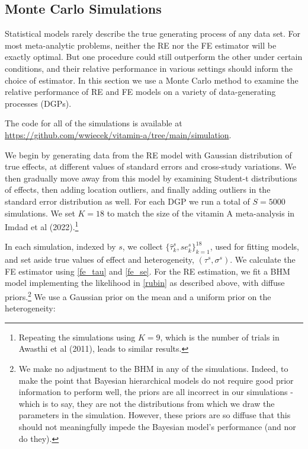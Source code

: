 \documentclass[12pt]{article}
\begin{document}
\subsection{Monte Carlo Simulations} \label{section:simulations}

Statistical models rarely describe the true generating process of any data set. For most meta-analytic problems, neither the RE nor the FE estimator will be exactly optimal. But one procedure could still outperform the other under certain conditions, and their relative performance in various settings should inform the choice of estimator. In this section we use a Monte Carlo method to examine the relative performance of RE and FE models on a variety of data-generating processes (DGPs).

The code for all of the simulations is available at \url{https://github.com/wwiecek/vitamin-a/tree/main/simulation}.

We begin by generating data from the RE model with Gaussian distribution of true effects, at different values of standard errors and cross-study variations. We then gradually move away from this model by examining Student-t distributions of effects, then adding location outliers, and finally adding outliers in the standard error distribution as well. 
For each DGP we run a total of $S = 5000$ simulations. We set $K=18$ to match the size of the vitamin A meta-analysis in Imdad et al (2022).\footnote{Repeating the simulations using $K=9$, which is the number of trials in Awasthi et al (2011), leads to similar results.}

In each simulation, indexed by $s$, we collect $\{\hat{\tau}_k^s, se_k^s\}_{k=1}^18$, used for fitting models, and set aside true values of effect and heterogeneity, $(\tau^{s}, \sigma^{s})$. We calculate the FE estimator using \eqref{fe_tau} and \eqref{fe_se}. For the RE estimation, we fit a BHM model implementing the likelihood in \eqref{rubin} as described above, with diffuse priors.\footnote{We make no adjustment to the BHM in any of the simulations. Indeed, to make the point that Bayesian hierarchical models do not require good prior information to perform well, the priors are all incorrect in our simulations - which is to say, they are not the distributions from which we draw the parameters in the simulation. However, these priors are so diffuse that this should not meaningfully impede the Bayesian model's performance (and nor do they).} We use a Gaussian prior on the mean and a uniform prior on the heterogeneity:
\end{document}
